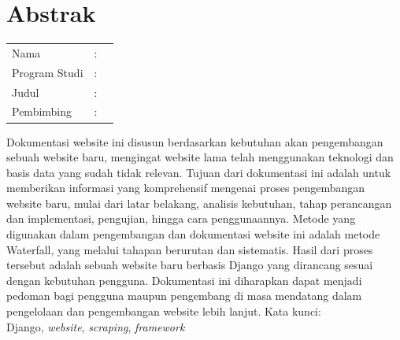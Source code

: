 %
%
%

\chapter*{Abstrak}

\vspace*{0.2cm}
{
	\setlength{\parindent}{0pt}
	
	\begin{tabular}{@{}l l p{10cm}}
		Nama&: & \penulis \\
		Program Studi&: & \program \\
		Judul&: & \judul \\
		Pembimbing&: & \pembimbing \\
	\end{tabular}

	\bigskip
	\bigskip

	Dokumentasi website ini disusun berdasarkan kebutuhan akan pengembangan sebuah website baru, mengingat website lama telah menggunakan teknologi dan basis data yang sudah tidak relevan. Tujuan dari dokumentasi ini adalah untuk memberikan informasi yang komprehensif mengenai proses pengembangan website baru, mulai dari latar belakang, analisis kebutuhan, tahap perancangan dan implementasi, pengujian, hingga cara penggunaannya. Metode yang digunakan dalam pengembangan dan dokumentasi website ini adalah metode Waterfall, yang melalui tahapan berurutan dan sistematis. Hasil dari proses tersebut adalah sebuah website baru berbasis Django yang dirancang sesuai dengan kebutuhan pengguna. Dokumentasi ini diharapkan dapat menjadi pedoman bagi pengguna maupun pengembang di masa mendatang dalam pengelolaan dan pengembangan website lebih lanjut.	\bigskip
	\bigskip
	Kata kunci:\\
	Django, \textit{website}, \textit{scraping}, \textit{framework}
}

\newpage